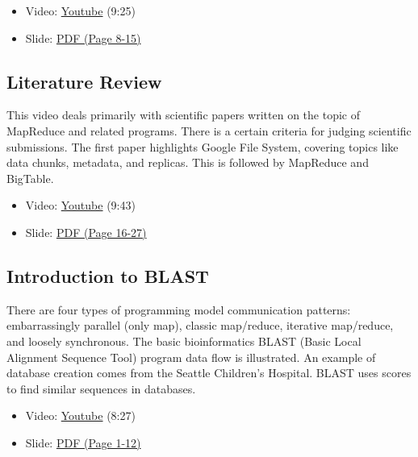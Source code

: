\begin{itemize}

\item
  Video: \href{https://www.youtube.com/watch?v=KWLY_maNEPA}{Youtube}
  (9:25)
\end{itemize}

\begin{itemize}

\item
  Slide:
  \href{https://drive.google.com/open?id=0B88HKpainTSfd3hkTG4yY2FYUVE}{PDF
  (Page 8-15)}
\end{itemize}

\subsection{Literature Review}\label{literature-review}

This video deals primarily with scientific papers written on the topic
of MapReduce and related programs. There is a certain criteria for
judging scientific submissions. The first paper highlights Google File
System, covering topics like data chunks, metadata, and replicas. This
is followed by MapReduce and BigTable.

\begin{itemize}

\item
  Video: \href{https://www.youtube.com/watch?v=5YmjrhEFQsk}{Youtube}
  (9:43)
\item
  Slide:
  \href{https://drive.google.com/open?id=0B88HKpainTSfd3hkTG4yY2FYUVE}{PDF
  (Page 16-27)}
\end{itemize}

\subsection{Introduction to BLAST}\label{introduction-to-blast}

There are four types of programming model communication patterns:
embarrassingly parallel (only map), classic map/reduce, iterative
map/reduce, and loosely synchronous. The basic bioinformatics BLAST
(Basic Local Alignment Sequence Tool) program data flow is illustrated.
An example of database creation comes from the Seattle Children's
Hospital. BLAST uses scores to find similar sequences in databases.

\begin{itemize}

\item
  Video: \href{https://www.youtube.com/watch?v=i3H9HmUYfq8}{Youtube}
  (8:27)
\item
  Slide:
  \href{https://drive.google.com/open?id=0B88HKpainTSfdnFvY1V3dlFTRlE}{PDF
  (Page 1-12)}
\end{itemize}

